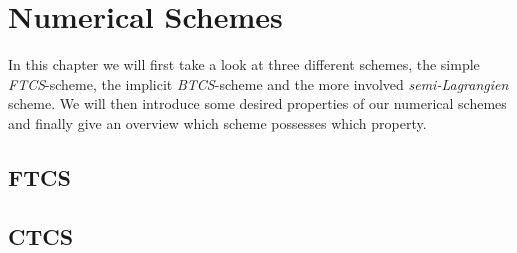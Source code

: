 \section{Numerical Schemes}
In this chapter we will first take a look at three different schemes, the simple \textit{FTCS}-scheme, the implicit \textit{BTCS}-scheme and the more involved \textit{semi-Lagrangien} scheme. We will then introduce some desired properties of our numerical schemes and finally give an overview which scheme possesses which property.
\subsection{FTCS}
\subsection{CTCS}
